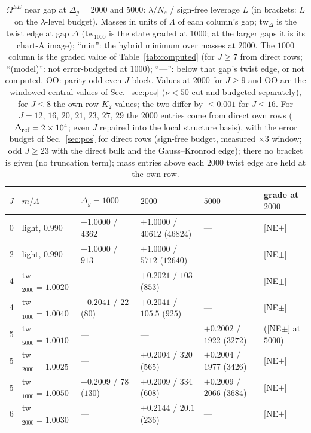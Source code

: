\documentclass[aps,prl,onecolumn,superscriptaddress,nofootinbib]{revtex4-2}
\begin{document}
\begin{table}[!htbp]
\caption{\label{tab:gap2000}$\Omega^{EE}$ near gap at $\Delta_g=2000$ and $5000$: $\lambda/N_s$ / sign-free leverage $L$
(in brackets: $L$ on the $\lambda$-level budget). Masses in units of $\Lambda$ of each column's gap; tw$_{\Delta}$ is the twist edge at
gap $\Delta$ (tw$_{1000}$ is the state graded at $1000$; at the larger gaps it is its chart-A image); ``min'': the hybrid minimum over
masses at $2000$. The $1000$ column is the graded value of Table~\ref{tab:computed} (for $J\ge7$ from direct rows; ``(model)'': not
error-budgeted at $1000$); ``---'': below that gap's twist edge, or not computed. OO: parity-odd even-$J$ block. Values at $2000$ for $J\ge9$ and OO are the windowed central values of Sec.~\ref{sec:pos} ($\nu<50$ cut and budgeted separately), for
$J\le8$ the own-row $K_2$ values; the two differ by $\le0.001$ for $J\le16$. For $J=12$, $16$, $20$, $21$, $23$, $27$, $29$ the $2000$
entries come from direct own rows ($\Delta_{\rm ref}=2\times10^4$; even $J$ repaired into the local structure basis), with the error budget
of Sec.~\ref{sec:pos} for direct rows (sign-free budget, measured $\times3$ window; odd $J\ge23$ with the direct bulk and the
Gauss--Kronrod edge); there no bracket is given (no truncation term); mass entries above each $2000$ twist edge are held at the own row.}
\scriptsize
\begin{ruledtabular}
\begin{tabular}{rlllll}
$J$ & $m/\Lambda$ & $\Delta_g=1000$ & $2000$ & $5000$ & grade at $2000$\\\hline
0 & light, $0.990$ & $+1.0000$ / $4362$ & $+1.0000$ / $40612$ ($46824$) & --- & [NE$\pm$]\\
2 & light, $0.990$ & $+1.0000$ / $913$ & $+1.0000$ / $5712$ ($12640$) & --- & [NE$\pm$]\\
4 & tw$_{2000}=1.0020$ & --- & $+0.2021$ / $103$ ($853$) & --- & [NE$\pm$]\\
4 & tw$_{1000}=1.0040$ & $+0.2041$ / $22$ ($80$) & $+0.2041$ / $105.5$ ($925$) & --- & [NE$\pm$]\\
5 & tw$_{5000}=1.0010$ & --- & --- & $+0.2002$ / $1922$ ($3272$) & ([NE$\pm$] at $5000$)\\
5 & tw$_{2000}=1.0025$ & --- & $+0.2004$ / $320$ ($565$) & $+0.2004$ / $1977$ ($3426$) & [NE$\pm$]\\
5 & tw$_{1000}=1.0050$ & $+0.2009$ / $78$ ($130$) & $+0.2009$ / $334$ ($608$) & $+0.2009$ / $2066$ ($3684$) & [NE$\pm$]\\
6 & tw$_{2000}=1.0030$ & --- & $+0.2144$ / $20.1$ ($236$) & --- & [NE$\pm$]\\

\end{tabular}
\end{ruledtabular}
\end{table}
\end{document}
